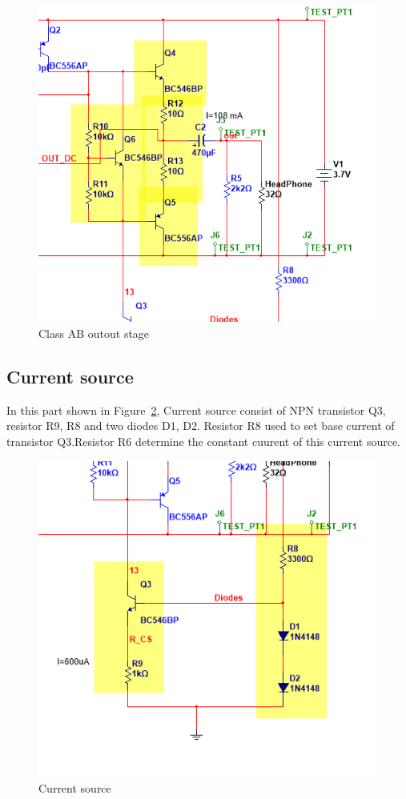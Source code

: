 \begin{figure}[htbp]
	\centering
	\includegraphics[scale=0.7]{"../Photo/Chap5/Class AB outout stage"}
	\caption{Class AB outout stage}
	\label{fig:Class AB outout stage}
\end{figure}

\subsection{Current source }  
In this part shown in Figure~\ref{fig:Current source}, Current source consist of NPN transistor Q3, resistor R9, R8 and two diodes D1, D2.
Resistor R8 used to set base current of transistor Q3.Resistor R6 determine the constant cuurent of this current source.

\begin{figure}[htbp]
	\centering
	\includegraphics[scale=0.7]{"../Photo/Chap5/Current source"}
	\caption{Current source}
	\label{fig:Current source}
\end{figure}

